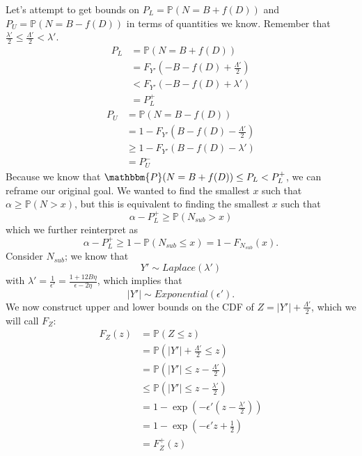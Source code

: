\documentclass[11pt]{scrartcl} %
\begin{document}
Let's attempt to get bounds on $P_{L} = \mathbb{P}(N = B + f(D))$ and $P_{U} = \mathbb{P}(N = B - f(D))$ in terms of quantities we know. Remember that $\frac{\lambda'}{2} \leq \frac{\Lambda'}{2} < \lambda'$.
\begin{align}
	P_{L} &= \mathbb{P}(N = B + f(D)) \nonumber \\
		  &= F_{Y'}(-B - f(D) + \frac{\Lambda'}{2}) \nonumber \\
		  &< F_{Y'}(-B - f(D) + \lambda') \nonumber \\
		  &= P_{L}^{+} \nonumber
\end{align}
\begin{align}
	P_{U} &= \mathbb{P}(N = B - f(D)) \nonumber \\
		  &= 1 - F_{Y'}(B - f(D) - \frac{\Lambda'}{2}) \nonumber \\
		  &\geq 1 - F_{Y'}(B - f(D) - \lambda') \nonumber \\
		  &= P_{U}^{-} \nonumber
\end{align}
Because we know that $\mathbbm{P}(N=B+f(D)) \leq P_L < P_{L}^{+}$, we can reframe our original goal. We wanted to find the smallest $x$ such that $\alpha \geq \mathbb{P}(N > x)$, but this is equivalent to finding the smallest $x$ such that
\[ \alpha - P_{L}^{+} \geq \mathbb{P}(N_{sub} > x) \]
which we further reinterpret as
\[ \alpha - P_{L}^{+} \geq 1 - \mathbb{P}(N_{sub} \leq x) = 1 - F_{N_{sub}}(x). \]
Consider $N_{sub}$; we know that
\[ Y' \sim Laplace (\lambda') \]
with $\lambda' = \frac{1}{\epsilon'} = \frac{1 + 12B \eta}{\epsilon - 2 \eta}$, which implies that
\[ \vert Y' \vert \sim Exponential(\epsilon'). \]
We now construct upper and lower bounds on the CDF of $Z = \vert Y' \vert + \frac{\Lambda'}{2}$, which we will call $F_{Z}$:
\begin{align}
	F_{Z}(z) &= \mathbb{P}(Z \leq z) \nonumber \\
			 &= \mathbb{P}\left( \vert Y' \vert + \frac{\Lambda'}{2} \leq z \right) \nonumber \\
			 &= \mathbb{P} \left( \vert Y' \vert \leq z - \frac{\Lambda'}{2} \right) \nonumber \\
			 &\leq \mathbb{P} \left( \vert Y' \vert \leq z - \frac{\lambda'}{2} \right) \nonumber \\
			 &= 1 - \exp\left( -\epsilon'(z - \frac{\lambda'}{2}) \right) \nonumber \\
			 &= 1 - \exp\left( -\epsilon'z + \frac{1}{2} \right) \nonumber \\
			 &= F_{Z}^{+}(z) \nonumber
\end{align}
\end{document}
